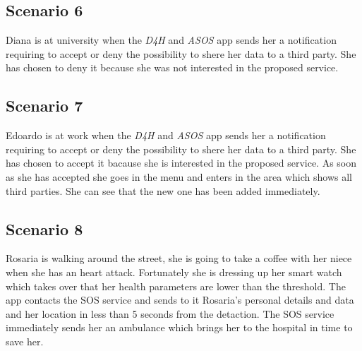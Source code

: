 \subsection{Scenario 6}
Diana is at university when the \textit{D4H} and \textit{ASOS} app sends her a notification requiring to accept or deny the possibility to shere her data to a third party.
She has chosen to deny it because she was not interested in the proposed service.

\subsection{Scenario 7}
Edoardo is at work when the \textit{D4H} and \textit{ASOS} app sends her a notification requiring to accept or deny the possibility to shere her data to a third party.
She has chosen to accept it bacause she is interested in the proposed service. As soon as she has accepted she goes in the menu and enters in the area which shows all third parties. She can see that the new one has been added immediately.

\subsection{Scenario 8}
Rosaria is walking around the street, she is going to take a coffee with her niece when she has an heart attack. Fortunately she is dressing up her smart watch which takes over that her health parameters are lower than the threshold. The app contacts the SOS service and sends to it Rosaria's personal details and data and her location in less than 5 seconds from the detaction. The SOS service immediately sends her an ambulance which brings her to the hospital in time to save her.
